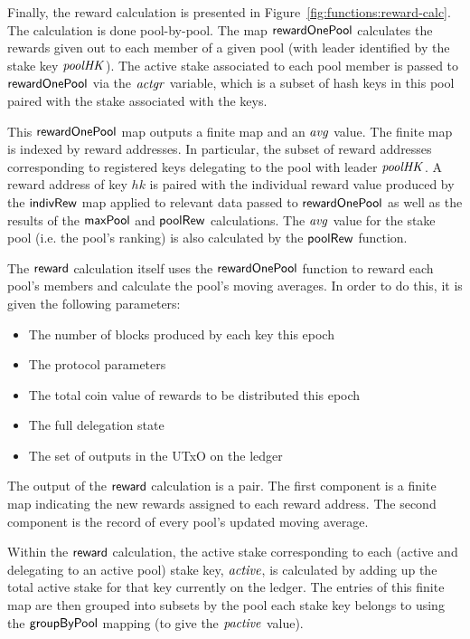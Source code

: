 Finally, the reward calculation is presented in
Figure~\ref{fig:functions:reward-calc}. The calculation is done pool-by-pool.
The map $\mathsf{rewardOnePool}$ calculates the rewards given out to each member
of a given pool (with leader identified by
the stake key $\mathit{poolHK}$). The active stake associated to each
pool member is passed to $\mathsf{rewardOnePool}$
via the $\mathit{actgr}$ variable, which is a subset of hash keys in this pool
paired with the stake associated with the keys.

This $\mathsf{rewardOnePool}$ map outputs a finite map and an $\mathit{avg}$
value. The finite map is indexed
by reward addresses. In particular, the subset of reward addresses corresponding
to registered keys delegating to the pool with leader $\mathit{poolHK}$.
A reward address of key $hk$ is paired with the individual reward value
produced by the $\mathsf{indivRew}$ map applied to relevant data passed to
$\mathsf{rewardOnePool}$ as well as the results of the $\mathsf{maxPool}$
and $\mathsf{poolRew}$ calculations. The $\mathit{avg}$ value for the stake pool
(i.e. the pool's ranking) is also calculated by the $\mathsf{poolRew}$ function.

The $\mathsf{reward}$ calculation itself uses the $\mathsf{rewardOnePool}$ function to
reward each pool's members and calculate the pool's moving averages. In order to
do this, it is given the following parameters:

\begin{itemize}
\item The number of blocks produced by each key this epoch
\item The protocol parameters
\item The total coin value of rewards to be distributed this epoch
\item The full delegation state
\item The set of outputs in the UTxO on the ledger
\end{itemize}

The output of the $\mathsf{reward}$ calculation is a pair. The first component is
a finite map indicating the new rewards assigned to each reward address.
The second component is the record of every pool's updated moving average.

Within the $\mathsf{reward}$ calculation, the active stake corresponding to each
(active and delegating to an active pool) stake key, $\mathit{active}$, is
calculated by adding up the total active stake for that key currently on the
ledger. The entries of this finite map are then grouped into subsets by the pool
each stake key belongs to using the $\mathsf{groupByPool}$ mapping (to give the
$\mathit{pactive}$ value).

